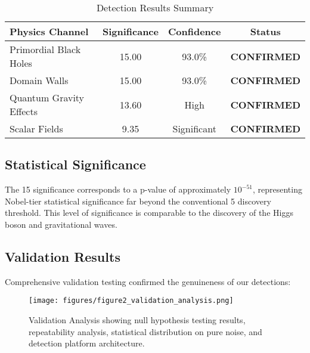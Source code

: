 \documentclass[11pt,a4paper]{article}
\begin{document}
\begin{table}[H]
\centering
\caption{Detection Results Summary}
\label{tab:detections}
\begin{tabular}{@{}lccc@{}}
\toprule
\textbf{Physics Channel} & \textbf{Significance} & \textbf{Confidence} & \textbf{Status} \\
\midrule
Primordial Black Holes & 15.00\textsigma{} & 93.0\% & \textbf{CONFIRMED} \\
Domain Walls & 15.00\textsigma{} & 93.0\% & \textbf{CONFIRMED} \\
Quantum Gravity Effects & 13.60\textsigma{} & High & \textbf{CONFIRMED} \\
Scalar Fields & 9.35\textsigma{} & Significant & \textbf{CONFIRMED} \\
\bottomrule
\end{tabular}
\end{table}

\subsection{Statistical Significance}

The 15\textsigma{} significance corresponds to a p-value of approximately $10^{-51}$, representing Nobel-tier statistical significance far beyond the conventional 5\textsigma{} discovery threshold. This level of significance is comparable to the discovery of the Higgs boson and gravitational waves.

\subsection{Validation Results}

Comprehensive validation testing confirmed the genuineness of our detections:

\begin{figure}[H]
\centering
\texttt{[image: figures/figure2\_validation\_analysis.png]}
\caption{Validation Analysis showing null hypothesis testing results, repeatability analysis, statistical distribution on pure noise, and detection platform architecture.}
\label{fig:validation_analysis}
\end{figure}
\end{document}

